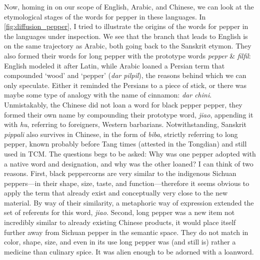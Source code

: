 Now, homing in on our scope of English, Arabic, and Chinese, we can look at the etymological stages of the words for pepper in these languages. In \cref{fig:diffusion_pepper}, I tried to illustrate the origins of the words for pepper in the languages under inspection. We see that the branch that leads to English is on the same trajectory as Arabic, both going back to the Sanskrit etymon. They also formed their words for long pepper with the prototype words \textit{pepper} \& \textit{filfil}: English modeled it after Latin, while Arabic loaned a Persian term that compounded `wood' and `pepper' (\textit{dar pilpil}), the reasons behind which we can only speculate. Either it reminded the Persians to a piece of stick, or there was maybe some type of analogy with the name of cinnamon: \textit{dar chini}. Unmistakably, the Chinese did not loan a word for black pepper pepper, they formed their own name by compounding their prototype word, \textit{jiao}, appending it with \textit{hu}, referring to foreigners, Western barbarians. Notwithstanding, Sanskrit \textit{pippali} also survives in Chinese, in the form of \textit{biba}, strictly referring to long pepper, known probably before Tang times (attested in the \gls{Tongdian}) and still used in \gls{TCM}. The questions begs to be asked: Why was one pepper adopted with a native word and designation, and why was the other loaned? I can think of two reasons. First, black peppercorns are very similar to the indigenous Sichuan peppers---in their shape, size, taste, and function---therefore it seems obvious to apply the term that already exist and conceptually very close to the new material. By way of their similarity, a metaphoric way of expression extended the set of referents for this word, \textit{jiao}. Second, long pepper was a new item not incredibly similar to already existing Chinese products, it would place itself further away from Sichuan pepper in the semantic space. They do not match in color, shape, size, and even in its use long pepper was (and still is) rather a medicine than culinary spice. It was alien enough to be adorned with a loanword.



